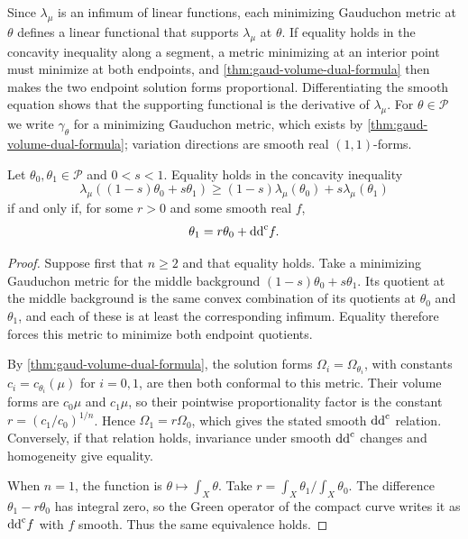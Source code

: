 Since $\lambda_\mu$ is an infimum of linear functions, each minimizing Gauduchon metric at $\theta$ defines a linear functional that supports $\lambda_\mu$ at $\theta$. If equality holds in the concavity inequality along a segment, a metric minimizing at an interior point must minimize at both endpoints, and \cref{thm:gaud-volume-dual-formula} then makes the two endpoint solution forms proportional. Differentiating the smooth equation shows that the supporting functional is the derivative of $\lambda_\mu$. For $\theta\in\mathscr P$ we write $\gamma_\theta$ for a minimizing Gauduchon metric, which exists by \cref{thm:gaud-volume-dual-formula}; variation directions are smooth real $(1,1)$-forms.

\begin{theorem}\label{thm:gaud-volume-concavity-equality}
Let $\theta_0,\theta_1\in\mathscr P$ and $0<s<1$. Equality holds in the concavity inequality
\[
 \lambda_\mu((1-s)\theta_0+s\theta_1)
 \geq(1-s)\lambda_\mu(\theta_0)+s\lambda_\mu(\theta_1)
\]
if and only if, for some $r>0$ and some smooth real $f$,
\[
 \theta_1=r\theta_0+\mathrm{dd}^{\mathrm{c}} f.
\]
\end{theorem}
\begin{proof}
Suppose first that $n\geq2$ and that equality holds. Take a minimizing Gauduchon metric for the middle background $(1-s)\theta_0+s\theta_1$. Its quotient at the middle background is the same convex combination of its quotients at $\theta_0$ and $\theta_1$, and each of these is at least the corresponding infimum. Equality therefore forces this metric to minimize both endpoint quotients.

By \cref{thm:gaud-volume-dual-formula}, the solution forms $\Omega_i=\Omega_{\theta_i}$, with constants $c_i=c_{\theta_i}(\mu)$ for $i=0,1$, are then both conformal to this metric. Their volume forms are $c_0\mu$ and $c_1\mu$, so their pointwise proportionality factor is the constant $r=(c_1/c_0)^{1/n}$. Hence $\Omega_1=r\Omega_0$, which gives the stated smooth $\mathrm{dd}^{\mathrm{c}}$ relation. Conversely, if that relation holds, invariance under smooth $\mathrm{dd}^{\mathrm{c}}$ changes and homogeneity give equality.

When $n=1$, the function is $\theta\mapsto\int_X\theta$. Take $r=\int_X\theta_1/\int_X\theta_0$. The difference $\theta_1-r\theta_0$ has integral zero, so the Green operator of the compact curve writes it as $\mathrm{dd}^{\mathrm{c}} f$ with $f$ smooth. Thus the same equivalence holds.
\end{proof}

